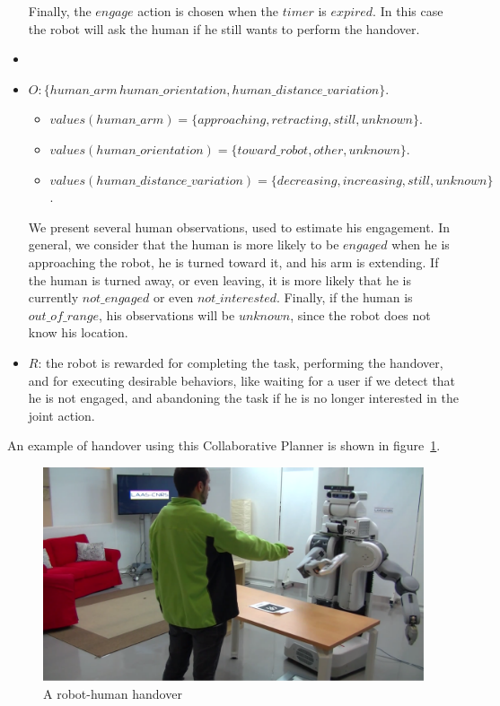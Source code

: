 \begin{itemize}
		Finally, the $engage$ action is chosen when the $timer$ is $expired$. In this case the robot will ask the human if he still wants to perform the handover.
	\item
	\item $O:\{human\_arm\,human\_orientation,human\_distance\_variation\}$.
		\begin{itemize}
			\item $values(human\_arm)=\{approaching,retracting,still,unknown\}$.
			\item $values(human\_orientation)=\{toward\_robot,other,unknown\}$.
			\item $values(human\_distance\_variation)=\{decreasing,increasing,still,unknown\}$.
		\end{itemize}

		We present several human observations, used to estimate his engagement. In general, we consider that the human is more likely to be $engaged$ when he is approaching the robot, he is turned toward it, and his arm is extending. If the human is turned away, or even leaving, it is more likely that he is currently $not\_engaged$ or even $not\_interested$. Finally, if the human is $out\_of\_range$, his observations will be $unknown$, since the robot does not know his location.

	\item  $R$: the robot is rewarded for completing the task, performing the handover, and for executing desirable behaviors, like waiting for a user if we detect that he is not engaged, and abandoning the task if he is no longer interested in the joint action. 
\end{itemize}

An example of handover using this Collaborative Planner is shown in figure~\ref{fig:task_execution-handover}.

\begin{figure}[h!]
	\centering
	\includegraphics[scale=0.3]{img/coworker/task_execution/handover.pdf}
	\caption[Handover]{A robot-human handover}
	\label{fig:task_execution-handover}
\end{figure}
